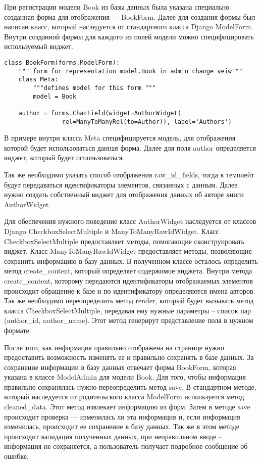 При регистрации модели Book из базы данных была указана специально созданная форма для отображения --- BookForm. Далее для создания формы был написан класс, который наследуется от стандартного класса Django ModelForm. Внутри созданной формы для каждого из полей модели можно специфицировать используемый виджет.

{
\small \begin{verbatim}
class BookForm(forms.ModelForm):
    """ form for representation model.Book in admin change veiw"""
    class Meta:
        """defines model for this form """
        model = Book

    author = forms.CharField(widget=AuthorWidget(
                rel=ManyToManyRel(to=Author)), label='Authors')
\end{verbatim}
}

В примере внутри класса Meta специфицируется модель, для отображения которой будет использоваться данная форма. Далее для поля author определяется виджет, который будет использоваться. 

Так же необходимо указать способ отображения raw\_id\_fields, тогда в темплейт будут передаваться идентификаторы элементов, связанных с данным. Далее нужно создать собственный виджет для отображения данных об авторе книги AuthorWidget. 

Для обеспечения нужного поведение класс AuthorWidget наследуется от классов Django CheckboxSelectMultiple и ManyToManyRawIdWidget. Класс CheckboxSelectMultiple предоставляет методы, помогающие сконструировать виджет. Класс ManyToManyRawIdWidget предоставляет методы, позволяющие сохранить информацию в базу данных. В полученном классе осталось определить метод create\_content, который определяет содержимое виджета. Внутри метода create\_content, которому передаются идентификаторы отображаемых элементов происходит обращение к базе и по идентификатору определяются имена авторов. Так же необходимо переопределить метод render, который будет вызывать метод класса CheckboxSelectMultiple, передавая ему нужные параметры -- список пар (author\_id, author\_name). Этот метод генерирут представление поля в нужном формате.

После того, как информация правильно отображена на странице нужно предоставить возможность изменять ее и правильно сохранять в базе данных. За сохранение  информации в базу данных отвечает форма BookForm, которая указана в классе ModelAdmin для модели Book. Для того, чтобы информация правильно сохранялась нужно переопределить метод save. В стандартном методе, который наследуется от родительского класса ModelForm используется метод cleaned\_data. Этот метод извлекает информацию из форм. Затем в методе save происходит проверка --- изменилась ли эта информация и, если информация изменилась, происходит ее сохранение в базу данных. Так же в этом методе происходит валидация полученных данных, при неправильном вводе -- информация не сохраняется, а пользователь получает подробное сообщение об ошибке. 

